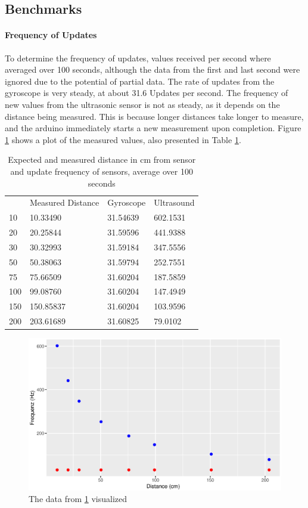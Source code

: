\subsection{Benchmarks}
\label{subsec:benchmark}

\paragraph{Frequency of Updates}
To determine the frequency of updates, values received per second where averaged over 100 seconds, although the data from the first and last second were ignored due to the potential of partial data.
The rate of updates from the gyroscope is very steady, at about 31.6 Updates per second.
The frequency of new values from the ultrasonic sensor is not as steady, as it depends on the distance being measured.
This is because longer distances take longer to measure, and the arduino immediately starts a new measurement upon completion. Figure \ref{fig:benchmark} shows a plot of the measured values, also presented in Table \ref{table:benchmark}.

\begin{table}
    \centering
    \begin{tabular}{l|lll}
            & Measured Distance & Gyroscope & Ultrasound \\
        \cline{1-3}
        10  & 10.33490          & 31.54639  & 602.1531   \\
        20  & 20.25844          & 31.59596  & 441.9388   \\
        30  & 30.32993          & 31.59184  & 347.5556   \\
        50  & 50.38063          & 31.59794  & 252.7551   \\
        75  & 75.66509          & 31.60204  & 187.5859   \\
        100 & 99.08760          & 31.60204  & 147.4949   \\
        150 & 150.85837         & 31.60204  & 103.9596   \\
        200 & 203.61689         & 31.60825  & 79.0102    \\
    \end{tabular}

    \caption{Expected and measured distance in cm from sensor and update frequency of sensors, average over 100 seconds}
    \label{table:benchmark}
\end{table}

\begin{figure}
    \centering
    \includegraphics[width=0.5\linewidth]{figures/benchmark.eps}
    \caption{The data from \ref{table:benchmark} visualized}
    \label{fig:benchmark}
\end{figure}

